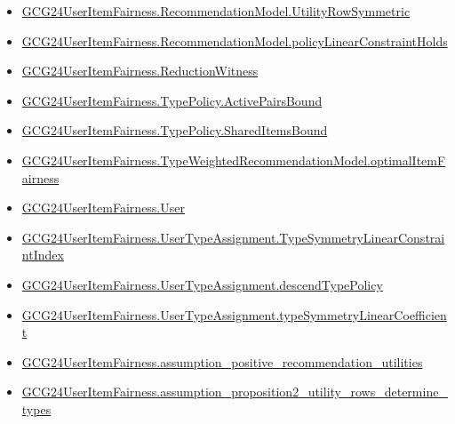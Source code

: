 \documentclass[10pt]{article}
\begin{document}
\begin{itemize}
\item \hyperlink{governing-declaration-992f6746a708f991}{GCG24\allowbreak{}User\allowbreak{}Item\allowbreak{}Fairness.\allowbreak{}Recommendation\allowbreak{}Model.\allowbreak{}Utility\allowbreak{}Row\allowbreak{}Symmetric}
\item \hyperlink{governing-declaration-8a554d9944c3a41e}{GCG24\allowbreak{}User\allowbreak{}Item\allowbreak{}Fairness.\allowbreak{}Recommendation\allowbreak{}Model.\allowbreak{}policy\allowbreak{}Linear\allowbreak{}Constraint\allowbreak{}Holds}
\item \hyperlink{governing-declaration-09e04866bceb3cdb}{GCG24\allowbreak{}User\allowbreak{}Item\allowbreak{}Fairness.\allowbreak{}Reduction\allowbreak{}Witness}
\item \hyperlink{governing-declaration-173e8c56e288c106}{GCG24\allowbreak{}User\allowbreak{}Item\allowbreak{}Fairness.\allowbreak{}Type\allowbreak{}Policy.\allowbreak{}Active\allowbreak{}Pairs\allowbreak{}Bound}
\item \hyperlink{governing-declaration-5f5edf92c1bf49ad}{GCG24\allowbreak{}User\allowbreak{}Item\allowbreak{}Fairness.\allowbreak{}Type\allowbreak{}Policy.\allowbreak{}Shared\allowbreak{}Items\allowbreak{}Bound}
\item \hyperlink{governing-declaration-fc7d3f75e1b48fb3}{GCG24\allowbreak{}User\allowbreak{}Item\allowbreak{}Fairness.\allowbreak{}Type\allowbreak{}Weighted\allowbreak{}Recommendation\allowbreak{}Model.\allowbreak{}optimal\allowbreak{}Item\allowbreak{}Fairness}
\item \hyperlink{governing-declaration-800dd691bc989470}{GCG24\allowbreak{}User\allowbreak{}Item\allowbreak{}Fairness.\allowbreak{}User}
\item \hyperlink{governing-declaration-92e299e5cf2fa6d7}{GCG24\allowbreak{}User\allowbreak{}Item\allowbreak{}Fairness.\allowbreak{}User\allowbreak{}Type\allowbreak{}Assignment.\allowbreak{}Type\allowbreak{}Symmetry\allowbreak{}Linear\allowbreak{}Constraint\allowbreak{}Index}
\item \hyperlink{governing-declaration-ec2efcd757fba498}{GCG24\allowbreak{}User\allowbreak{}Item\allowbreak{}Fairness.\allowbreak{}User\allowbreak{}Type\allowbreak{}Assignment.\allowbreak{}descend\allowbreak{}Type\allowbreak{}Policy}
\item \hyperlink{governing-declaration-986fc584dd737730}{GCG24\allowbreak{}User\allowbreak{}Item\allowbreak{}Fairness.\allowbreak{}User\allowbreak{}Type\allowbreak{}Assignment.\allowbreak{}type\allowbreak{}Symmetry\allowbreak{}Linear\allowbreak{}Coefficient}
\item \hyperlink{paper-prerequisite-c3fb62153de6abb9}{GCG24\allowbreak{}User\allowbreak{}Item\allowbreak{}Fairness.\allowbreak{}assumption\_\allowbreak{}positive\_\allowbreak{}recommendation\_\allowbreak{}utilities}
\item \hyperlink{paper-prerequisite-47771cedb9e12e6f}{GCG24\allowbreak{}User\allowbreak{}Item\allowbreak{}Fairness.\allowbreak{}assumption\_\allowbreak{}proposition2\_\allowbreak{}utility\_\allowbreak{}rows\_\allowbreak{}determine\_\allowbreak{}types}
\end{itemize}
\end{document}
